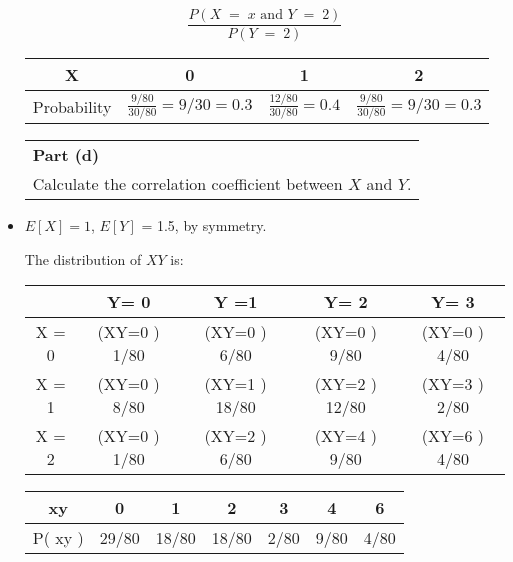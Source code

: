 \documentclass[a4paper,12pt]{article}
\begin{document}
\begin{itemize}
		\[ \frac{P( X \;=\; x \mbox{ and } Y \;=\;2)}{P(Y\;=\;2)}  \]
		
		\begin{center}
			\begin{tabular}{|c|c|c|c|} \hline
				X &  0 & 1 & 2 \\ \hline
				Probability & $\frac{9/80}{30/80} = 9/30 = 0.3$ & $\frac{12/80}{30/80}  = 0.4$  & $\frac{9/80}{30/80} = 9/30 = 0.3$  \\ \hline
			\end{tabular}
		\end{center}
		
		
		
		
		\newpage
		
		\begin{table}[ht!]
			\centering
			\begin{tabular}{|p{15cm}|}
				\hline  \large
				\noindent \textbf{Part (d)} \\ \large  Calculate the correlation coefficient between $X$ and $Y$.
				\\ \hline
			\end{tabular}
		\end{table}
		\item $E[X] = 1$, $E[Y]$ = 1.5, by symmetry. 
		
		The distribution of $XY$ is:
		
		\begin{center}
			\begin{tabular}{|c||c|c|c|c|} \hline
				&  Y= 0 & Y =1 & Y= 2 & Y= 3 \\ \hline 
				X = 0 & ({\normalsize XY=0} )  1/80 & ({\normalsize XY=0} )  6/80 & ({\normalsize XY=0} )  9/80 & ({\normalsize XY=0} )  4/80 \\ \hline 
				X = 1 & ({\normalsize XY=0} )  8/80 & ({\normalsize XY=1} ) 18/80 & ({\normalsize XY=2} ) 12/80 & ({\normalsize XY=3} ) 2/80 \\ \hline 
				X = 2 & ({\normalsize XY=0} ) 1/80 & ({\normalsize XY=2} ) 6/80 & ({\normalsize XY=4} )  9/80 &  ({\normalsize XY=6} ) 4/80 \\ \hline  
				
			\end{tabular}
		\end{center}
		
		\begin{center}
			\begin{tabular}{|c|c|c|c|c|c|c|} \hline 
				xy & 0 & 1 & 2 & 3 & 4 & 6\\ \hline
				P( xy ) & 29/80&  18/80&  18/80 & 2/80&  9/80&  4/80\\ \hline
			\end{tabular}
		\end{center}
		

\end{itemize}
\end{document}
